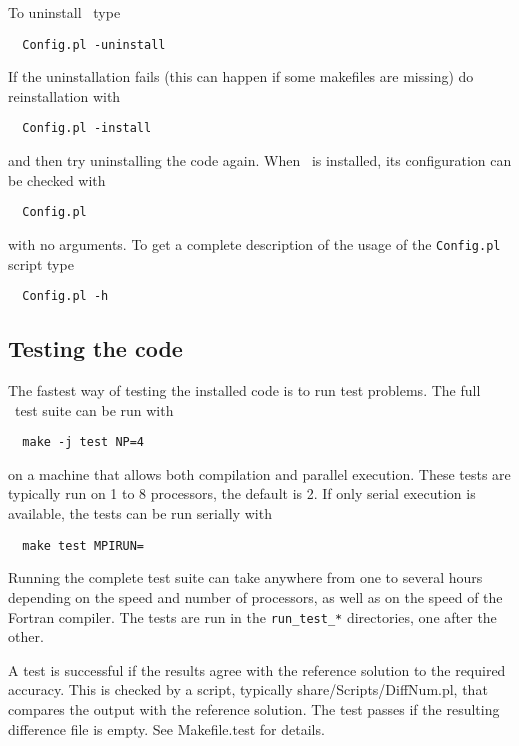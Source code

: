To uninstall \BATSRUS\ type
\begin{verbatim}
  Config.pl -uninstall
\end{verbatim}
If the uninstallation fails (this can happen if some makefiles are missing)
do reinstallation with
\begin{verbatim}
  Config.pl -install
\end{verbatim}
and then try uninstalling the code again.
When \BATSRUS\ is installed, its configuration can be checked with
\begin{verbatim}
  Config.pl
\end{verbatim}
with no arguments. 
To get a complete description of the usage of the 
{\tt Config.pl} script type
\begin{verbatim}
  Config.pl -h
\end{verbatim}

\subsection{Testing the code}

The fastest way of testing the installed code is to run test problems.
The full \BATSRUS\ test suite can be run with
\begin{verbatim}
  make -j test NP=4
\end{verbatim}
on a machine that allows both compilation and parallel execution. 
These tests are typically run on 1 to 8 processors, the default is 2.
If only serial execution is available, the tests can be run serially with
\begin{verbatim}
  make test MPIRUN=
\end{verbatim}
Running the complete test suite can take anywhere from one to several
hours depending on the speed and number of processors, as well as on
the speed of the Fortran compiler. The tests are run in the 
{\tt run\_test\_*} directories, one after the other.

A test is successful if the results agree with the reference solution
to the required accuracy. This is checked by a script, typically
share/Scripts/DiffNum.pl, that compares the output with the reference
solution.  The test passes if the resulting difference file is empty.
See Makefile.test for details.

